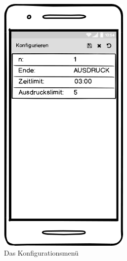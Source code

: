 \begin{figure}[htbp]
\begin{subfigure}{.33\textwidth}
  \includegraphics[width=0.7\textwidth]{img/konfig_menu.png}
  \caption{Das Konfigurationsmenü}
  \label{config}
\end{subfigure}
\begin{subfigure}{.33\textwidth}
  \centering

\end{subfigure}
\end{figure}
